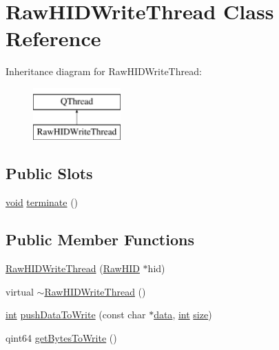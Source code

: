 \hypertarget{class_raw_h_i_d_write_thread}{\section{Raw\-H\-I\-D\-Write\-Thread Class Reference}
\label{class_raw_h_i_d_write_thread}
}
Inheritance diagram for Raw\-H\-I\-D\-Write\-Thread\-:\begin{figure}[H]
\begin{center}
\leavevmode
\includegraphics[height=2.000000cm]{class_raw_h_i_d_write_thread}
\end{center}
\end{figure}
\subsection*{Public Slots}
\begin{DoxyCompactItemize}
\item 
\hyperlink{group___u_a_v_objects_plugin_ga444cf2ff3f0ecbe028adce838d373f5c}{void} \hyperlink{group___raw_h_i_d_plugin_gaf92ea93cbc5d6c7672f8853d3e761122}{terminate} ()
\end{DoxyCompactItemize}
\subsection*{Public Member Functions}
\begin{DoxyCompactItemize}
\item 
\hyperlink{group___raw_h_i_d_plugin_gac9c8ee05f180a569c664780b9760849e}{Raw\-H\-I\-D\-Write\-Thread} (\hyperlink{class_raw_h_i_d}{Raw\-H\-I\-D} $\ast$hid)
\item 
virtual \hyperlink{group___raw_h_i_d_plugin_gaf760c0fa4d7799e982c74e1b6aaba378}{$\sim$\-Raw\-H\-I\-D\-Write\-Thread} ()
\item 
\hyperlink{ioapi_8h_a787fa3cf048117ba7123753c1e74fcd6}{int} \hyperlink{group___raw_h_i_d_plugin_ga563f2214706aafbf75b158b6ca2ed73e}{push\-Data\-To\-Write} (const char $\ast$\hyperlink{glext_8h_a8850df0785e6fbcc2351af3b686b8c7a}{data}, \hyperlink{ioapi_8h_a787fa3cf048117ba7123753c1e74fcd6}{int} \hyperlink{glext_8h_a014d89bd76f74ef3a29c8f04b473eb76}{size})
\item 
qint64 \hyperlink{group___raw_h_i_d_plugin_ga33316914e9994a7ee878bffe07175781}{get\-Bytes\-To\-Write} ()
\end{DoxyCompactItemize}
